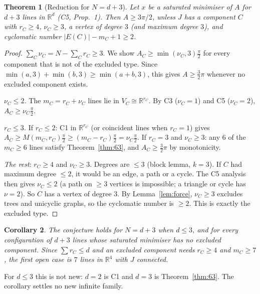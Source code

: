 \documentclass[11pt]{article}
\newtheorem{theorem}{Theorem}
\newtheorem{corollary}[theorem]{Corollary}
\theoremstyle{remark}
\begin{document}
\begin{theorem}[Reduction for $N=d+3$]\label{thm:red}
Let $x$ be a saturated minimiser of $A$ for $d+3$ lines in $\mathbb R^d$ (C5, Prop.~1). Then
$A\ge3\pi/2$, unless $J$ has a component $C$ with $r_C\ge4$, $\nu_C\ge3$, a vertex of degree $3$
(and maximum degree $3$), and cyclomatic number $|E(C)|-m_C+1\ge2$.
\end{theorem}
\begin{proof}
$\sum_C\nu_C=N-\sum_Cr_C\ge3$. We show $A_C\ge\min(\nu_C,3)\frac\pi2$ for every component that is not of
the excluded type. Since $\min(a,3)+\min(b,3)\ge\min(a+b,3)$, this gives $A\ge\frac32\pi$ whenever no
excluded component exists.

\emph{$\nu_C\le2$.} The $m_C=r_C+\nu_C$ lines lie in $V_C\cong\mathbb R^{r_C}$. By C3 ($\nu_C=1$) and C5
($\nu_C=2$), $A_C\ge\nu_C\frac\pi2$.

\emph{$r_C\le3$.} If $r_C\le2$: C1 in $\mathbb R^{r_C}$ (or coincident lines when $r_C=1$) gives
$A_C\ge M(m_C,r_C)\frac\pi2\ge(m_C-r_C)\frac\pi2=\nu_C\frac\pi2$. If $r_C=3$ and $\nu_C\ge3$: any $6$ of the
$m_C\ge6$ lines satisfy Theorem~\ref{thm:63}, and $A_C\ge\frac32\pi$ by monotonicity.

\emph{The rest}: $r_C\ge4$ and $\nu_C\ge3$. Degrees are $\le3$ (block lemma, $k=3$). If $C$ had maximum
degree $\le2$, it would be an edge, a path or a cycle. The C5 analysis then gives $\nu_C\le2$ (a path on
$\ge3$ vertices is impossible; a triangle or cycle has $\nu=2$). So $C$ has a vertex of degree $3$. By
Lemma~\ref{lem:force}, $\nu_C\ge3$ excludes trees and unicyclic graphs, so the cyclomatic number is
$\ge2$. This is exactly the excluded type.
\end{proof}

\begin{corollary}
The conjecture holds for $N=d+3$ when $d\le3$, and for every configuration of $d+3$ lines whose
saturated minimiser has no excluded component. Since $\sum r_C\le d$ and an excluded component needs
$r_C\ge4$ and $m_C\ge7$, the first open case is $7$ lines in $\mathbb R^4$ with $J$ connected.
\end{corollary}

For $d\le3$ this is not new: $d=2$ is C1 and $d=3$ is Theorem~\ref{thm:63}. The corollary settles no
new infinite family.
\end{document}

